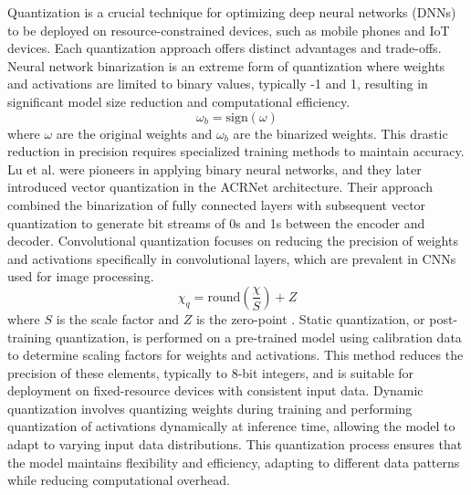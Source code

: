 \documentclass[lettersize,journal]{IEEEtran}
\begin{document}
Quantization is a crucial technique for optimizing deep neural networks (DNNs) to be deployed on resource-constrained devices, such as mobile phones and IoT devices. Each quantization approach offers distinct advantages and trade-offs. Neural network binarization is an extreme form of quantization where weights and activations are limited to binary values, typically -1 and 1, resulting in significant model size reduction and computational efficiency. 
\begin{equation}
	\omega_{b}=\mathrm{sign}(\omega)
\end{equation}
where \begin{math}
	\omega
\end{math}
are the original weights and \begin{math} \omega_{b}\end{math} are the binarized weights. This drastic reduction in precision requires specialized training methods to maintain accuracy. \cite{aaa1} Lu et al. \cite{abp} were pioneers in applying binary neural networks, and they later introduced vector quantization in the ACRNet\cite{abx} architecture. Their approach combined the binarization of fully connected layers with subsequent vector quantization to generate bit streams of 0s and 1s between the encoder and decoder. Convolutional quantization focuses on reducing the precision of weights and activations specifically in convolutional layers, which are prevalent in CNNs used for image processing. 
\begin{equation}
	\chi_{q}=\mathrm{round}(\frac{\chi}{S})+Z
\end{equation}
where \begin{math}
	S
\end{math} is the scale factor and \begin{math}
Z
\end{math} is the zero-point \cite{convolutionalquantization}. 
Static quantization, or post-training quantization, is performed on a pre-trained model using calibration data to determine scaling factors for weights and activations. This method reduces the precision of these elements, typically to 8-bit integers, and is suitable for deployment on fixed-resource devices with consistent input data\cite{staticquantization}.
Dynamic quantization involves quantizing weights during training and performing quantization of activations dynamically at inference time, allowing the model to adapt to varying input data distributions. This quantization process ensures that the model maintains flexibility and efficiency, adapting to different data patterns while reducing computational overhead. \cite{dynamicquantization}
\end{document}
